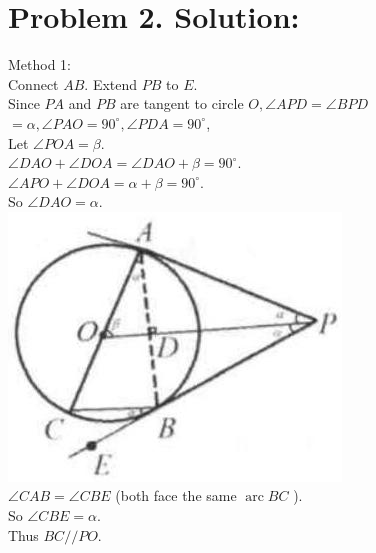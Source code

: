 \documentclass[10pt]{article}
\begin{document}
\section*{Problem 2. Solution:}
Method 1:\\
Connect \(A B\). Extend \(P B\) to \(E\).\\
Since \(P A\) and \(P B\) are tangent to circle \(O, \angle A P D=\angle B P D\) \(=\alpha, \angle P A O=90^{\circ}, \angle P D A=90^{\circ}\),\\
Let \(\angle P O A=\beta\).\\
\(\angle D A O+\angle D O A=\angle D A O+\beta=90^{\circ}\).\\
\(\angle A P O+\angle D O A=\alpha+\beta=90^{\circ}\).\\
So \(\angle D A O=\alpha\).\\
\includegraphics[max width=\textwidth, center]{2025_04_17_97bc1f7e44d93c271a88g-171(1)}\\
\(\angle C A B=\angle C B E\) (both face the same \(\operatorname{arc} B C\) ).\\
So \(\angle C B E=\alpha\).\\
Thus \(B C / / P O\).
\end{document}
